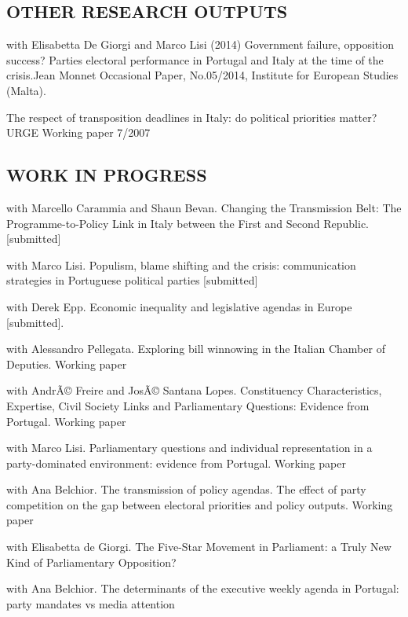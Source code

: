\documentclass[11pt,]{article}
\renewenvironment{itemize}{
  \begin{list}{}{
    \setlength{\leftmargin}{1.5em}
  }
}{
  \end{list}
}
\begin{document}
\hypertarget{other-research-outputs}{%
\subsection{OTHER RESEARCH OUTPUTS}\label{other-research-outputs}}

\begin{itemize}
\item
  with Elisabetta De Giorgi and Marco Lisi (2014) Government failure,
  opposition success? Parties electoral performance in Portugal and
  Italy at the time of the crisis.Jean Monnet Occasional Paper,
  No.05/2014, Institute for European Studies (Malta).
\item
  The respect of transposition deadlines in Italy: do political
  priorities matter? URGE Working paper 7/2007
\end{itemize}

\hypertarget{work-in-progress}{%
\subsection{WORK IN PROGRESS}\label{work-in-progress}}

\begin{itemize}
\item
  with Marcello Carammia and Shaun Bevan. Changing the Transmission
  Belt: The Programme-to-Policy Link in Italy between the First and
  Second Republic. {[}submitted{]}
\item
  with Marco Lisi. Populism, blame shifting and the crisis:
  communication strategies in Portuguese political parties
  {[}submitted{]}
\item
  with Derek Epp. Economic inequality and legislative agendas in Europe
  {[}submitted{]}.
\item
  with Alessandro Pellegata. Exploring bill winnowing in the Italian
  Chamber of Deputies. Working paper
\item
  with AndrÃ© Freire and JosÃ© Santana Lopes. Constituency
  Characteristics, Expertise, Civil Society Links and Parliamentary
  Questions: Evidence from Portugal. Working paper
\item
  with Marco Lisi. Parliamentary questions and individual representation
  in a party-dominated environment: evidence from Portugal. Working
  paper
\item
  with Ana Belchior. The transmission of policy agendas. The effect of
  party competition on the gap between electoral priorities and policy
  outputs. Working paper
\item
  with Elisabetta de Giorgi. The Five-Star Movement in Parliament: a
  Truly New Kind of Parliamentary Opposition?
\item
  with Ana Belchior. The determinants of the executive weekly agenda in
  Portugal: party mandates vs media attention
\end{itemize}
\end{document}
